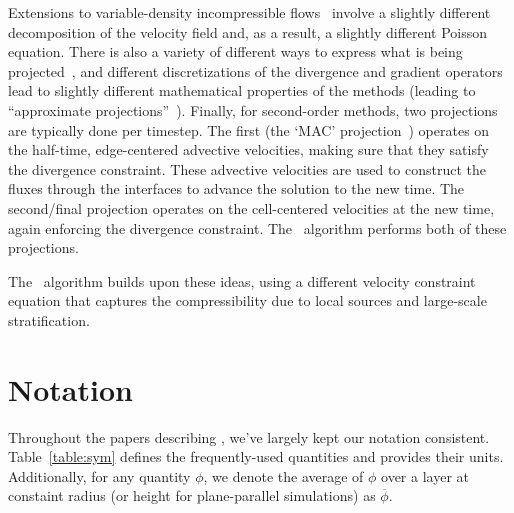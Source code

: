 Extensions to variable-density incompressible
flows~\cite{bellMarcus:1992b} involve a slightly different
decomposition of the velocity field and, as a result, a slightly
different Poisson equation.  There is also a variety of different ways
to express what is being projected~\cite{almgren:bell:crutchfield},
and different discretizations of the divergence and gradient operators
lead to slightly different mathematical properties of the methods
(leading to ``approximate
projections''~\cite{almgrenBellSzymczak:1996}).  Finally, for
second-order methods, two projections are typically done per timestep.
The first (the `MAC' projection~\cite{bellColellaHowell:1991})
operates on the half-time, edge-centered advective velocities, making
sure that they satisfy the divergence constraint.  These advective
velocities are used to construct the fluxes through the interfaces to
advance the solution to the new time.  The second/final projection
operates on the cell-centered velocities at the new time, again
enforcing the divergence constraint.  The \maestro\ algorithm performs
both of these projections.

The \maestro\ algorithm builds upon these ideas, using a different
velocity constraint equation that captures the compressibility
due to local sources and large-scale stratification.



\section{Notation}

Throughout the papers describing \maestro, we've largely kept our
notation consistent.  Table~\ref{table:sym} defines the
frequently-used quantities and provides their units.  Additionally,
for any quantity $\phi$, we denote the average of $\phi$ over a layer
at constaint radius (or height for plane-parallel simulations) as
$\overline{\phi}$.




